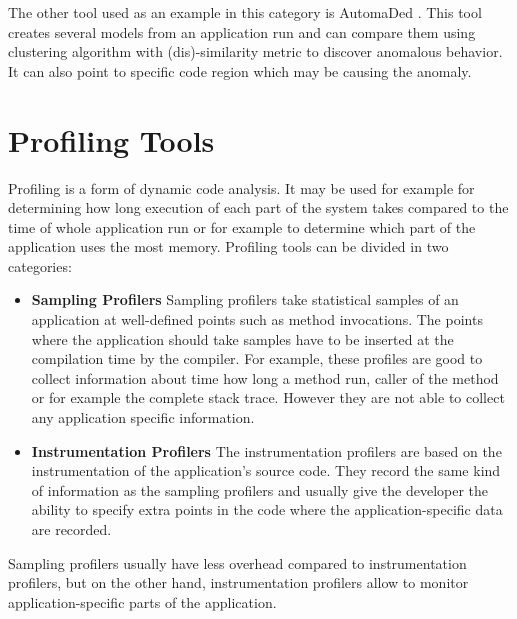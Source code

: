 The other tool used as an example in this category is AutomaDed \cite{HPC}. This tool creates several models from an application run and can compare them using clustering algorithm with (dis)-similarity metric to discover anomalous behavior. It can also point to specific code region which may be causing the anomaly.

\section{Profiling Tools}
Profiling is a form of dynamic code analysis. It may be used for example for determining how long execution of each part of the system takes compared to the time of whole application run or for example to determine which part of the application uses the most memory. Profiling tools can be divided in two categories:
\begin{itemize}
	\item \textbf{Sampling Profilers} \newline
Sampling profilers take statistical samples of an application at well-defined points such as method invocations. The points where the application should take samples have to be inserted at the compilation time by the compiler. For example, these profiles are good to collect information about time how long a method run, caller of the method or for example the complete stack trace. However they are not able to collect any application specific information.
	\item \textbf{Instrumentation Profilers} \newline
The instrumentation profilers are based on the instrumentation of the application's source code. They record the same kind of information as the sampling profilers and usually give the developer the ability to specify extra points in the code where the application-specific data are recorded. 
\end{itemize}
 Sampling profilers usually have less overhead compared to instrumentation profilers, but on the other hand, instrumentation profilers allow to monitor application-specific parts of the application.
 
